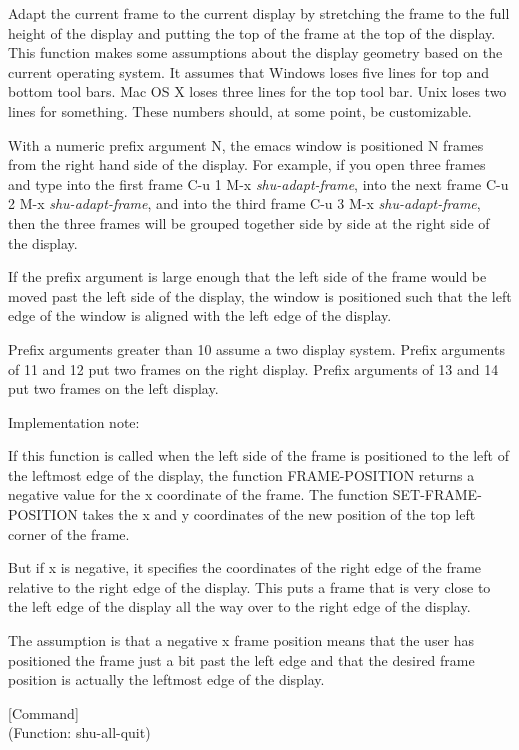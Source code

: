 \begin{doc-string}
Adapt the current frame to the current display by stretching the frame to the
full height of the display and putting the top of the frame at the top of the
display.  This function makes some assumptions about the display geometry based
on the current operating system.  It assumes that Windows loses five lines for
top and bottom tool bars.  Mac OS X loses three lines for the top tool bar.
Unix loses two lines for something.  These numbers should, at some point, be
customizable.

With a numeric prefix argument N, the emacs window is positioned N frames from
the right hand side of the display.  For example, if you open three frames and
type into the first frame C-u 1 M-x \emph{shu-adapt-frame}, into the next frame
C-u 2 M-x \emph{shu-adapt-frame}, and into the third frame C-u 3 M-x \emph{shu-adapt-frame},
then the three frames will be grouped together side by side at the right side of
the display.

If the prefix argument is large enough that the left side of the frame would be
moved past the left side of the display, the window is positioned such that the
left edge of the window is aligned with the left edge of the display.

Prefix arguments greater than 10 assume a two display system.  Prefix arguments
of 11 and 12 put two frames on the right display.  Prefix arguments of 13 and
14 put two frames on the left display.

Implementation note:

If this function is called when the left side of the frame is positioned to the
left of the leftmost edge of the display, the function FRAME-POSITION returns a
negative value for the x coordinate of the frame.  The function
SET-FRAME-POSITION takes the x and y coordinates of the new position of the top
left corner of the frame.

But if x is negative, it specifies the coordinates of the right edge of the
frame relative to the right edge of the display.  This puts a frame that is very
close to the left edge of the display all the way over to the right edge of the
display.

The assumption is that a negative x frame position means that the user has
positioned the frame just a bit past the left edge and that the desired frame
position is actually the leftmost edge of the display.
\end{doc-string}

\vspace{1em}
\noindent
{}
\usebox{\funcname}
 \hfill [Command]\\%
 (Function: shu-all-quit)

